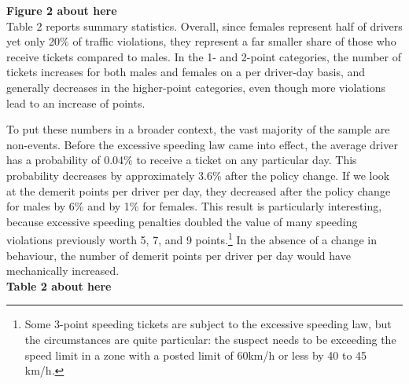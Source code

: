 \textbf{Figure 2 about here} \\

Table 2 reports summary statistics. Overall, since females represent half of drivers yet only 20\% of traffic violations, they represent a far smaller share of those who receive tickets compared to males. In the 1- and 2-point categories, the number of tickets increases for both males and females on a per driver-day basis, and generally decreases in the higher-point categories, even though more violations lead to an increase of points.

To put these numbers in a broader context, the vast majority of the sample are non-events. Before the excessive speeding law came into effect, the average driver has a probability of 0.04\% to receive a ticket on any particular day. This probability decreases by approximately 3.6\% after the policy change. If we look at the demerit points per driver per day, they decreased after the policy change for males by 6\% and by 1\% for females. This result is particularly interesting, because excessive speeding penalties doubled the value of many speeding violations previously worth 5, 7, and 9 points.\footnote{%
Some 3-point speeding tickets are subject to the excessive speeding law, but the circumstances are quite particular: the suspect needs to be exceeding the speed limit in a zone with a posted limit of 60km/h or less by 40 to 45 km/h.}
In the absence of a change in behaviour, the number of demerit points per driver per day would have mechanically increased. \\

\textbf{Table 2 about here} \\

